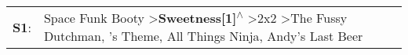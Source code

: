 \begin{supertabular}{p{0.03\textwidth}p{0.92\textwidth}}
 \textbf{S1}:  &  Space Funk Booty\textsuperscript{} \textgreater \enspace \textbf{Sweetness[1]\textsuperscript{$\wedge$}} \textgreater \enspace 2x2\textsuperscript{} \textgreater \enspace The Fussy Dutchman\textsuperscript{}, 's Theme\textsuperscript{}, \enspace All Things Ninja\textsuperscript{}, \enspace Andy's Last Beer\textsuperscript{}  \enspace  \\
\end{supertabular}
